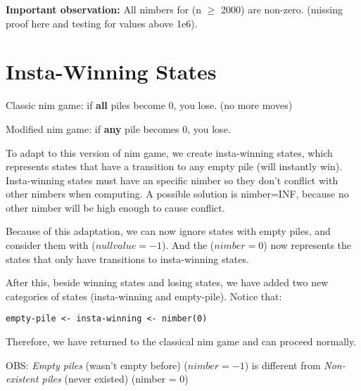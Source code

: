 \textbf{Important observation:} All nimbers for (n $\ge$ 2000) are non-zero.
(missing proof here and testing for values above 1e6).

\section{Insta-Winning States}

Classic nim game: if \textbf{all} piles become 0, you lose. (no more moves)

Modified nim game: if \textbf{any} pile becomes 0, you lose.

To adapt to this version of nim game, we create insta-winning states,
which represents states that have a transition to any empty pile (will instantly win).
Insta-winning states must have an specific nimber so they don't conflict with other nimbers when computing.
A possible solution is nimber=INF, because no other nimber will be high enough to cause conflict. 

Because of this adaptation, we can now ignore states with empty piles, and consider them with ($null value = -1$).
And the ($nimber = 0$) now represents the states that only have transitions to insta-winning states.

After this, beside winning states and losing states, we have added two new categories of states
(insta-winning and empty-pile). Notice that:

\begin{lstlisting}[language=raw]
empty-pile <- insta-winning <- nimber(0)
\end{lstlisting}

Therefore, we have returned to the classical nim game and can proceed normally.

OBS: \textit{Empty piles} (wasn't empty before) ($nimber = -1$) is different from \textit{Non-existent piles} (never existed) (nimber = 0)





